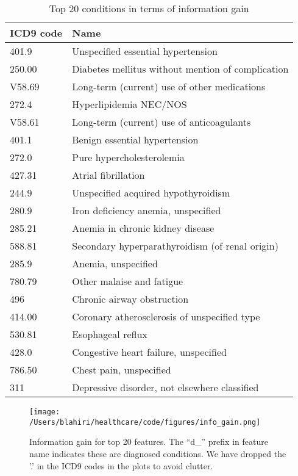 \begin{table}[ht]
\caption{Top 20 conditions in terms of information gain}
\begin{tabular}{ll}
\hline
ICD9 code & Name\\
\hline
401.9 & Unspecified essential hypertension\\
250.00 & Diabetes mellitus without mention of complication\\
V58.69 & Long-term (current) use of other medications\\
272.4 & Hyperlipidemia NEC/NOS\\
V58.61 & Long-term (current) use of anticoagulants\\
401.1 & Benign essential hypertension\\
272.0 & Pure hypercholesterolemia\\
427.31 & Atrial fibrillation\\
244.9 & Unspecified acquired hypothyroidism\\
280.9 & Iron deficiency anemia, unspecified\\
285.21 & Anemia in chronic kidney disease\\
588.81 & Secondary hyperparathyroidism (of renal origin)\\
285.9 & Anemia, unspecified\\
780.79 & Other malaise and fatigue\\
496 & Chronic airway obstruction\\
414.00 & Coronary atherosclerosis of unspecified type\\
530.81 & Esophageal reflux\\
428.0 & Congestive heart failure, unspecified\\
786.50 & Chest pain, unspecified\\
311 & Depressive disorder, not elsewhere classified\\
\hline
\end{tabular}
\label{tab:top_conditions}
\end{table}

\begin{figure}[!h]
    \centering
    \texttt{[image: /Users/blahiri/healthcare/code/figures/info\_gain.png]}
    \caption{\small Information gain for top 20 features. The ``d\_'' prefix in feature name indicates these are diagnosed conditions. We have dropped the '.' in the ICD9 codes in the plots to avoid clutter.}
    \label{fig:info_gain}
\end{figure}
 
